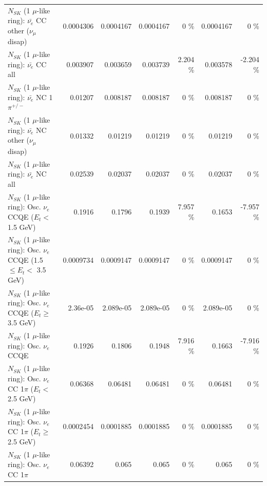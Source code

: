 \begin{table}
\begin{tabular}{| l | r | r | r  r | r  r |}
          $N_{SK}$ (1 $\mu$-like ring): $\bar{\nu_e}$ CC other ($\nu_\mu$ disap) &       0.0004306 &       0.0004167 &       0.0004167 &        0 \%  &       0.0004167 &        0 \%  \\ 
                            $N_{SK}$ (1 $\mu$-like ring): $\bar{\nu_{e}}$ CC all &        0.003907 &        0.003659 &        0.003739 &    2.204 \%  &        0.003578 &   -2.204 \%  \\ 
\hline
                     $N_{SK}$ (1 $\mu$-like ring): $\bar{\nu_e}$ NC 1$\pi^{+/-}$ &         0.01207 &        0.008187 &        0.008187 &        0 \%  &        0.008187 &        0 \%  \\ 
          $N_{SK}$ (1 $\mu$-like ring): $\bar{\nu_e}$ NC other ($\nu_\mu$ disap) &         0.01332 &         0.01219 &         0.01219 &        0 \%  &         0.01219 &        0 \%  \\ 
                            $N_{SK}$ (1 $\mu$-like ring): $\bar{\nu_{e}}$ NC all &         0.02539 &         0.02037 &         0.02037 &        0 \%  &         0.02037 &        0 \%  \\ 
\hline
\hline
\hline
             $N_{SK}$ (1 $\mu$-like ring): Osc. $\nu_e$ CCQE ($E_{t} <$ 1.5 GeV) &          0.1916 &          0.1796 &          0.1939 &    7.957 \%  &          0.1653 &   -7.957 \%  \\ 
    $N_{SK}$ (1 $\mu$-like ring): Osc. $\nu_e$ CCQE (1.5 $\leq E_{t} <$ 3.5 GeV) &       0.0009734 &       0.0009147 &       0.0009147 &        0 \%  &       0.0009147 &        0 \%  \\ 
          $N_{SK}$ (1 $\mu$-like ring): Osc. $\nu_e$ CCQE ($E_{t} \geq$ 3.5 GeV) &        2.36e-05 &       2.089e-05 &       2.089e-05 &        0 \%  &       2.089e-05 &        0 \%  \\ 
\hline
                                 $N_{SK}$ (1 $\mu$-like ring): Osc. $\nu_e$ CCQE &          0.1926 &          0.1806 &          0.1948 &    7.916 \%  &          0.1663 &   -7.916 \%  \\ 
\hline
        $N_{SK}$ (1 $\mu$-like ring): Osc. $\nu_e$ CC 1$\pi$ ($E_{t} <$ 2.5 GeV) &         0.06368 &         0.06481 &         0.06481 &        0 \%  &         0.06481 &        0 \%  \\ 
     $N_{SK}$ (1 $\mu$-like ring): Osc. $\nu_e$ CC 1$\pi$ ($E_{t} \geq$ 2.5 GeV) &       0.0002454 &       0.0001885 &       0.0001885 &        0 \%  &       0.0001885 &        0 \%  \\ 
\hline
                            $N_{SK}$ (1 $\mu$-like ring): Osc. $\nu_e$ CC 1$\pi$ &         0.06392 &           0.065 &           0.065 &        0 \%  &           0.065 &        0 \%  \\ 

\end{tabular}
\end{table}
